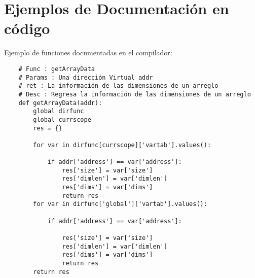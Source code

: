 \documentclass[krantz1,ChapterTOCs, spanish]{krantz}
\begin{document}
\part{Ejemplos de Documentación en código}

Ejemplo de funciones documentadas en el compilador:
\scriptsize
\begin{verbatim}
    # Func : getArrayData
    # Params : Una dirección Virtual addr
    # ret : La información de las dimensiones de un arreglo
    # Desc : Regresa la información de las dimensiones de un arreglo
    def getArrayData(addr):
        global dirfunc
        global currscope
        res = {}
    
        for var in dirfunc[currscope]['vartab'].values():
    
            if addr['address'] == var['address']:
                res['size'] = var['size']
                res['dimlen'] = var['dimlen']
                res['dims'] = var['dims']
                return res
        for var in dirfunc['global']['vartab'].values():
    
            if addr['address'] == var['address']:
    
                res['size'] = var['size']
                res['dimlen'] = var['dimlen']
                res['dims'] = var['dims']
                return res
        return res
    
   
\end{verbatim}
\scriptsize
\end{document}
